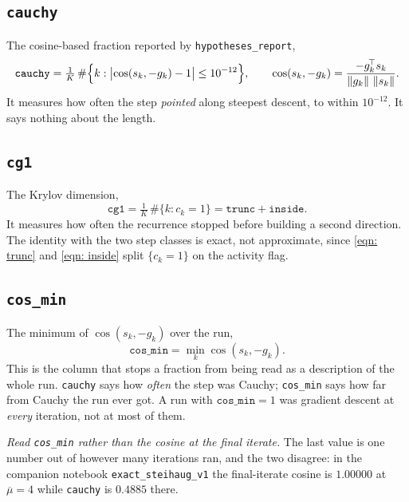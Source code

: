 \documentclass[11pt,a4paper]{article}
\providecommand{\norm}[1]{\left \lVert #1 \right \rVert}
\theoremstyle{remark}
\begin{document}
\subsection{\texttt{cauchy}}

The cosine-based fraction reported by \texttt{hypotheses\_report},
\begin{equation}
  \texttt{cauchy}
    = \tfrac1K \,\#\Bigl\{k : \bigl\lvert \cos(s_k, -g_k) - 1 \bigr\rvert
                                \leq 10^{-12}\Bigr\},
  \qquad
  \cos(s_k,-g_k) = \frac{-g_k^{\!\top}s_k}{\norm{g_k}\,\norm{s_k}}.
  \label{eqn: cauchy}
\end{equation}
It measures how often the step \emph{pointed} along steepest descent, to within
$10^{-12}$. It says nothing about the length.

\subsection{\texttt{cg1}}

The Krylov dimension,
\begin{equation}
  \texttt{cg1} = \tfrac1K \,\#\{k : c_k = 1\}
              = \texttt{trunc} + \texttt{inside}.
  \label{eqn: cg1}
\end{equation}
It measures how often the recurrence stopped before building a second direction.
The identity with the two step classes is exact, not approximate, since
\eqref{eqn: trunc} and \eqref{eqn: inside} split $\{c_k = 1\}$ on the activity
flag.

\subsection{\texttt{cos\_min}}

The minimum of $\cos(s_k,-g_k)$ over the run,
\begin{equation}
  \texttt{cos\_min} = \min_{k} \cos(s_k, -g_k).
  \label{eqn: cosmin}
\end{equation}
This is the column that stops a fraction from being read as a description of the
whole run. \texttt{cauchy} says how \emph{often} the step was Cauchy;
\texttt{cos\_min} says how far from Cauchy the run ever got. A run with
$\texttt{cos\_min} = 1$ was gradient descent at \emph{every} iteration, not at
most of them.

\emph{Read \texttt{cos\_min} rather than the cosine at the final iterate.} The
last value is one number out of however many iterations ran, and the two
disagree: in the companion notebook \texttt{exact\_steihaug\_v1} the final-iterate
cosine is $1.00000$ at $\overline{\mu} = 4$ while \texttt{cauchy} is $0.4885$
there.
\end{document}
